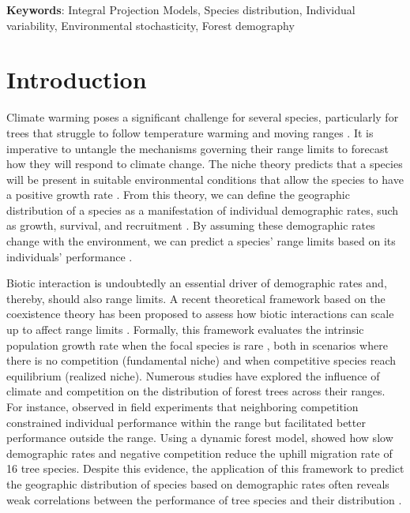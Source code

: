 \textbf{Keywords}: Integral Projection Models, Species
distribution, Individual variability, Environmental
stochasticity, Forest demography

\hypertarget{introduction}{%
\section{Introduction}\label{introduction}}

Climate warming poses a significant challenge for several species,
particularly for trees that struggle to follow temperature warming and
moving ranges \citep{Sittaro2017}. It is imperative to untangle the
mechanisms governing their range limits to forecast how they will
respond to climate change. The niche theory predicts that a species will
be present in suitable environmental conditions that allow the species
to have a positive growth rate \citep{Hutchinson1957}. From this theory,
we can define the geographic distribution of a species as a
manifestation of individual demographic rates, such as growth, survival,
and recruitment \citep{holt2009}. By assuming these demographic rates
change with the environment, we can predict a species' range limits
based on its individuals' performance
\citep{maguire1973niche, holt2009}.

Biotic interaction is undoubtedly an essential driver of demographic
rates and, thereby, should also range limits. A recent theoretical
framework based on the coexistence theory has been proposed to assess
how biotic interactions can scale up to affect range limits
\citep{Godsoe2017}. Formally, this framework evaluates the intrinsic
population growth rate when the focal species is rare
\citep{Chesson2000a}, both in scenarios where there is no competition
(fundamental niche) and when competitive species reach equilibrium
(realized niche). Numerous studies have explored the influence of
climate and competition on the distribution of forest trees across their
ranges. For instance, \citet{Ettinger2017} observed in field experiments
that neighboring competition constrained individual performance within
the range but facilitated better performance outside the range. Using a
dynamic forest model, \citet{Scherrer2020} showed how slow demographic
rates and negative competition reduce the uphill migration rate of 16
tree species. Despite this evidence, the application of this framework
to predict the geographic distribution of species based on demographic
rates often reveals weak correlations between the performance of tree
species and their distribution
\citep{McGill2012, Thuiller2014, Csergo2017, bohner2020, LeSquin2021, Midolo2021, Guyennon2023}.

